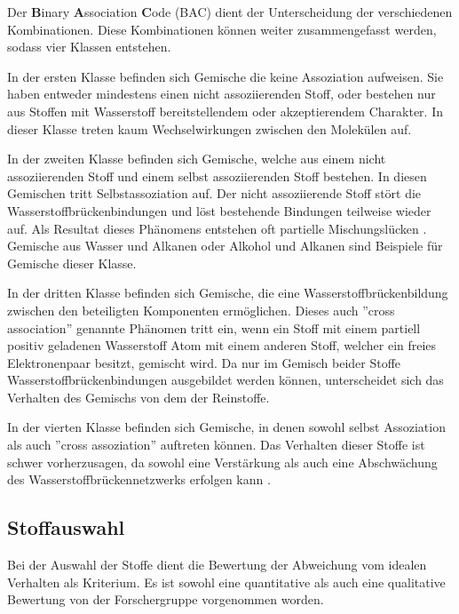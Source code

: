 \documentclass[../thesis.tex]{subfiles}
\begin{document}
Der \textbf{B}inary \textbf{A}ssociation \textbf{C}ode (BAC) dient der Unterscheidung der verschiedenen Kombinationen. Diese Kombinationen können weiter zusammengefasst werden, sodass vier Klassen entstehen.

In der ersten Klasse befinden sich Gemische die keine Assoziation aufweisen. Sie haben entweder mindestens einen nicht assoziierenden Stoff, oder bestehen nur aus Stoffen mit Wasserstoff bereitstellendem oder akzeptierendem Charakter. In dieser Klasse treten kaum Wechselwirkungen zwischen den Molekülen auf.

In der zweiten Klasse befinden sich Gemische, welche aus einem nicht assoziierenden Stoff und einem selbst assoziierenden Stoff bestehen. In diesen Gemischen tritt Selbstassoziation auf. Der nicht assoziierende Stoff stört die Wasserstoffbrückenbindungen und löst bestehende Bindungen teilweise wieder auf. Als Resultat dieses Phänomens entstehen oft partielle Mischungslücken \cite{jaubert2020benchmark}. Gemische aus Wasser und Alkanen oder Alkohol und Alkanen sind Beispiele für Gemische dieser Klasse.

In der dritten Klasse befinden sich Gemische, die eine Wasserstoffbrückenbildung zwischen den beteiligten Komponenten ermöglichen. Dieses auch ''cross association'' genannte Phänomen tritt ein, wenn ein Stoff mit einem partiell positiv geladenen Wasserstoff Atom mit einem anderen Stoff, welcher ein freies Elektronenpaar besitzt, gemischt wird. Da nur im Gemisch beider Stoffe Wasserstoffbrückenbindungen ausgebildet werden können, unterscheidet sich das Verhalten des Gemischs von dem der Reinstoffe.

In der vierten Klasse befinden sich Gemische, in denen sowohl selbst Assoziation als auch ''cross assoziation'' auftreten können. Das Verhalten dieser Stoffe ist schwer vorherzusagen, da sowohl eine Verstärkung als auch eine Abschwächung des Wasserstoffbrückennetzwerks erfolgen kann \cite{jaubert2020benchmark}.

\subsection{Stoffauswahl}

Bei der Auswahl der Stoffe dient die Bewertung der Abweichung vom idealen Verhalten als Kriterium. Es ist sowohl eine quantitative als auch eine qualitative Bewertung von der Forschergruppe vorgenommen worden.
\end{document}
